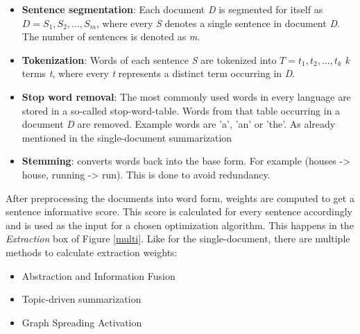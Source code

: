 \begin{itemize}
	\item \textbf{Sentence segmentation}: Each document \textit{D} is segmented for itself as \(D = {S_{1}, S_{2},..., S_{m}}\), where every \textit{S} denotes a single sentence in document \textit{D}. The number of sentences is denoted as \textit{m}.
	\item \textbf{Tokenization}: Words of each sentence \textit{S} are tokenized into \(T = {t_{1}, t_{2},..., t_{k}}\) \textit{k} terms \textit{t}, where every \textit{t} represents a distinct term occurring in \textit{D}. 
	\item \textbf{Stop word removal}: The most commonly used words in every language are stored in a so-called stop-word-table. Words from that table occurring in a document \textit{D} are removed. Example words are 'a', 'an' or 'the'. As already mentioned in the single-document summarization
	\item \textbf{Stemming}: converts words back into the base form. For example (houses -> house, running -> run). This is done to avoid redundancy.
\end{itemize}
 
 
After preprocessing the documents into word form, weights are computed to get a sentence informative score. This score is calculated for every sentence accordingly and is used as the input for a chosen optimization algorithm. This happens in the \textit{Extraction} box of Figure \ref{multi}. Like for the single-document, there are multiple methods to calculate extraction weights:

\begin{itemize}
	\item Abstraction and Information Fusion
	\item Topic-driven summarization
	\item Graph Spreading Activation
\end{itemize}

